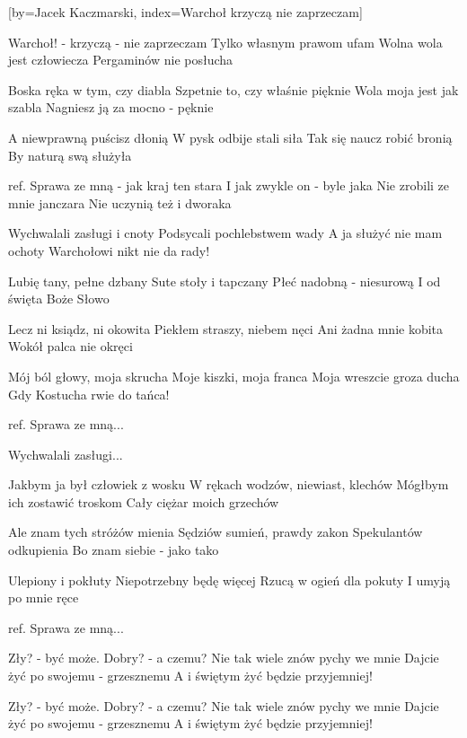 [by={Jacek Kaczmarski},
                     index={Warchoł krzyczą nie zaprzeczam}]
\beginverse

Warchoł! - krzyczą - nie zaprzeczam
Tylko własnym prawom ufam
Wolna wola jest człowiecza
Pergaminów nie posłucha

\endverse
\beginverse

Boska ręka w tym, czy diabla
Szpetnie to, czy właśnie pięknie
Wola moja jest jak szabla
Nagniesz ją za mocno - pęknie

\endverse
\beginverse

A niewprawną puścisz dłonią
W pysk odbije stali siła
Tak się naucz robić bronią
By naturą swą służyła

\endverse
\beginverse

ref.
Sprawa ze mną - jak kraj ten stara
I jak zwykle on - byle jaka
Nie zrobili ze mnie janczara
Nie uczynią też i dworaka

\endverse
\beginverse

Wychwalali zasługi i cnoty	
Podsycali pochlebstwem wady	
A ja służyć nie mam ochoty	
Warchołowi nikt nie da rady!

\endverse
\beginverse

Lubię tany, pełne dzbany	
Sute stoły i tapczany	
Płeć nadobną - niesurową	
I od święta Boże Słowo	

\endverse
\beginverse

Lecz ni ksiądz, ni okowita	
Piekłem straszy, niebem nęci	
Ani żadna mnie kobita	
Wokół palca nie okręci	

\endverse
\beginverse

Mój ból głowy, moja skrucha	
Moje kiszki, moja franca	
Moja wreszcie groza ducha	
Gdy Kostucha rwie do tańca!	

\endverse
\beginverse

ref.
Sprawa ze mną...

Wychwalali zasługi...

\endverse
\beginverse

Jakbym ja był człowiek z wosku	
W rękach wodzów, niewiast, klechów	
Mógłbym ich zostawić troskom	
Cały ciężar moich grzechów	

\endverse
\beginverse

Ale znam tych stróżów mienia	
Sędziów sumień, prawdy zakon	
Spekulantów odkupienia	
Bo znam siebie - jako tako	

\endverse
\beginverse

Ulepiony i pokłuty	
Niepotrzebny będę więcej	
Rzucą w ogień dla pokuty	
I umyją po mnie ręce	

\endverse
\beginverse

ref.
Sprawa ze mną...

\endverse
\beginverse

Zły? - być może. Dobry? - a czemu?	
Nie tak wiele znów pychy we mnie	
Dajcie żyć po swojemu - grzesznemu	
A i świętym żyć będzie przyjemniej!	

\endverse
\beginverse

Zły? - być może. Dobry? - a czemu?	
Nie tak wiele znów pychy we mnie	
Dajcie żyć po swojemu - grzesznemu	
A i świętym żyć będzie przyjemniej!

\endverse

\endsong
